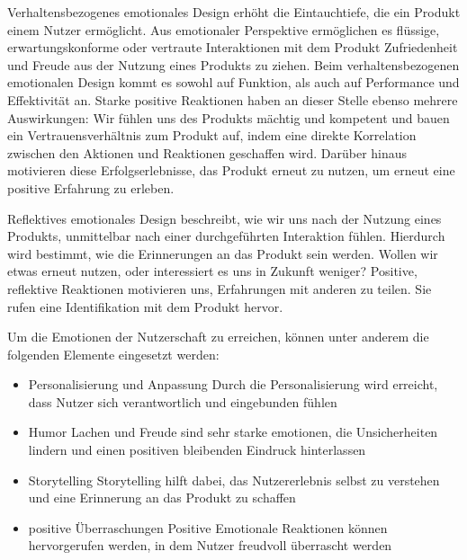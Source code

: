 \documentclass[./dokumentation.tex]{subfiles}
\begin{document}
\begin{figure}
    
\end{figure}

Verhaltensbezogenes emotionales Design erhöht die Eintauchtiefe, die ein Produkt einem Nutzer ermöglicht. Aus emotionaler Perspektive ermöglichen es flüssige, erwartungskonforme oder vertraute Interaktionen mit dem Produkt Zufriedenheit und Freude aus der Nutzung eines Produkts zu ziehen. Beim verhaltensbezogenen emotionalen Design kommt es sowohl auf Funktion, als auch auf Performance und Effektivität an.
Starke positive Reaktionen haben an dieser Stelle ebenso mehrere Auswirkungen: Wir fühlen uns des Produkts mächtig und kompetent und bauen ein Vertrauensverhältnis zum Produkt auf, indem eine direkte Korrelation zwischen den Aktionen und Reaktionen geschaffen wird. Darüber hinaus motivieren diese Erfolgserlebnisse, das Produkt erneut zu nutzen, um erneut eine positive Erfahrung zu erleben.


\begin{figure}
    
\end{figure}

Reflektives emotionales Design beschreibt, wie wir uns nach der Nutzung eines Produkts, unmittelbar nach einer durchgeführten Interaktion fühlen. Hierdurch wird bestimmt, wie die Erinnerungen an das Produkt sein werden. Wollen wir etwas erneut nutzen, oder interessiert es uns in Zukunft weniger? Positive, reflektive Reaktionen motivieren uns, Erfahrungen mit anderen zu teilen. Sie rufen eine Identifikation mit dem Produkt hervor.

\begin{figure}
    
\end{figure}

Um die Emotionen der Nutzerschaft zu erreichen, können unter anderem die folgenden Elemente eingesetzt werden: 
\begin{itemize}
    \item Personalisierung und Anpassung
    \subitem Durch die Personalisierung wird erreicht, dass Nutzer sich verantwortlich und eingebunden fühlen
    \item Humor
    \subitem Lachen und Freude sind sehr starke emotionen, die Unsicherheiten lindern und einen positiven bleibenden Eindruck hinterlassen
    \item Storytelling
    \subitem Storytelling hilft dabei, das Nutzererlebnis selbst zu verstehen und eine Erinnerung an das Produkt zu schaffen
    \item positive Überraschungen
    \subitem Positive Emotionale Reaktionen können hervorgerufen werden, in dem Nutzer freudvoll überrascht werden
\end{itemize}

\end{document}
